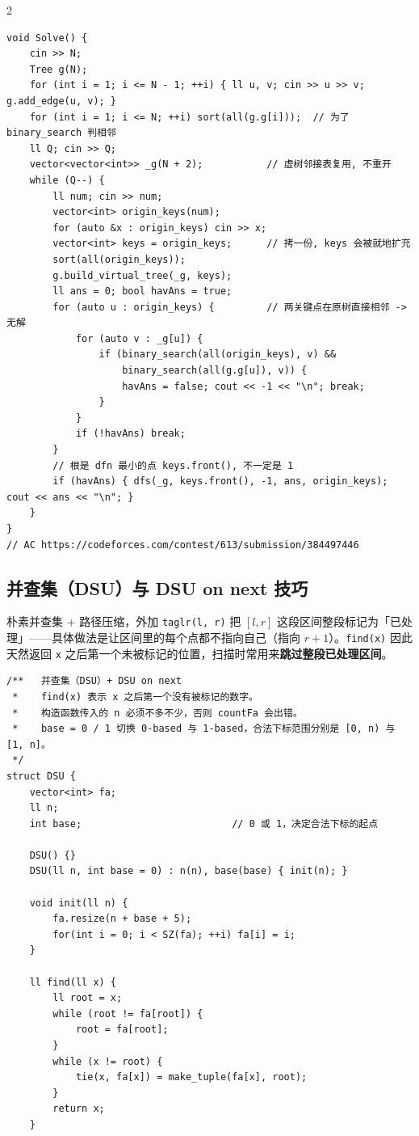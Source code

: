 \begin{multicols*}{2}
\begin{verbatim}
void Solve() {
    cin >> N;
    Tree g(N);
    for (int i = 1; i <= N - 1; ++i) { ll u, v; cin >> u >> v; g.add_edge(u, v); }
    for (int i = 1; i <= N; ++i) sort(all(g.g[i]));  // 为了 binary_search 判相邻
    ll Q; cin >> Q;
    vector<vector<int>> _g(N + 2);           // 虚树邻接表复用, 不重开
    while (Q--) {
        ll num; cin >> num;
        vector<int> origin_keys(num);
        for (auto &x : origin_keys) cin >> x;
        vector<int> keys = origin_keys;      // 拷一份, keys 会被就地扩充
        sort(all(origin_keys));
        g.build_virtual_tree(_g, keys);
        ll ans = 0; bool havAns = true;
        for (auto u : origin_keys) {         // 两关键点在原树直接相邻 -> 无解
            for (auto v : _g[u]) {
                if (binary_search(all(origin_keys), v) &&
                    binary_search(all(g.g[u]), v)) {
                    havAns = false; cout << -1 << "\n"; break;
                }
            }
            if (!havAns) break;
        }
        // 根是 dfn 最小的点 keys.front(), 不一定是 1
        if (havAns) { dfs(_g, keys.front(), -1, ans, origin_keys); cout << ans << "\n"; }
    }
}
// AC https://codeforces.com/contest/613/submission/384497446
		\end{verbatim}

		\subsection{并查集（DSU）与 DSU on next 技巧}

		朴素并查集 + 路径压缩，外加 \texttt{taglr(l, r)} 把 $[l, r]$ 这段区间整段标记为「已处理」——具体做法是让区间里的每个点都不指向自己（指向 $r+1$）。\texttt{find(x)} 因此天然返回 \texttt{x} 之后第一个未被标记的位置，扫描时常用来\textbf{跳过整段已处理区间}。

		\begin{verbatim}
/**   并查集（DSU）+ DSU on next
 *    find(x) 表示 x 之后第一个没有被标记的数字。
 *    构造函数传入的 n 必须不多不少，否则 countFa 会出错。
 *    base = 0 / 1 切换 0-based 与 1-based，合法下标范围分别是 [0, n) 与 [1, n]。
 */
struct DSU {
    vector<int> fa;
    ll n;
    int base;                          // 0 或 1，决定合法下标的起点

    DSU() {}
    DSU(ll n, int base = 0) : n(n), base(base) { init(n); }

    void init(ll n) {
        fa.resize(n + base + 5);
        for(int i = 0; i < SZ(fa); ++i) fa[i] = i;
    }

    ll find(ll x) {
        ll root = x;
        while (root != fa[root]) {
            root = fa[root];
        }
        while (x != root) {
            tie(x, fa[x]) = make_tuple(fa[x], root);
        }
        return x;
    }


\end{verbatim}
\end{multicols*}
